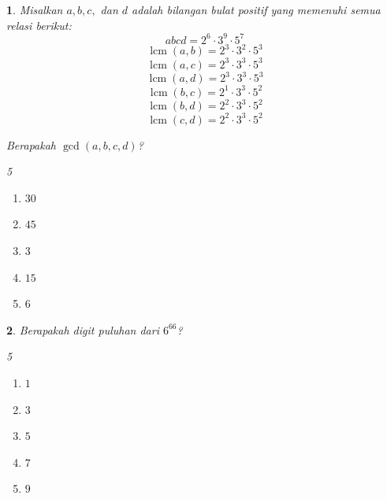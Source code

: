 \documentclass[11pt,a4paper,DIV=12]{scrartcl}
\theoremstyle{problemstyle}
\newtheorem{problem}{}
\theoremstyle{answerstyle}
\newenvironment{choices}[1][5]{%
  \begin{multicols}{#1}%
  \begin{enumerate}[label=(\Alph*)]%
}{%
  \end{enumerate}%
  \end{multicols}%
}
\begin{document}
\begin{problem}
  Misalkan \(a,b,c,\) dan \(d\) adalah bilangan bulat positif yang memenuhi semua relasi berikut:
  \[
    abcd=2^6\cdot 3^9\cdot 5^7
  \]
  \[
    \operatorname{lcm}(a,b)=2^3\cdot 3^2\cdot 5^3
  \]
  \[
    \operatorname{lcm}(a,c)=2^3\cdot 3^3\cdot 5^3
  \]
  \[
    \operatorname{lcm}(a,d)=2^3\cdot 3^3\cdot 5^3
  \]
  \[
    \operatorname{lcm}(b,c)=2^1\cdot 3^3\cdot 5^2
  \]
  \[
    \operatorname{lcm}(b,d)=2^2\cdot 3^3\cdot 5^2
  \]
  \[
    \operatorname{lcm}(c,d)=2^2\cdot 3^3\cdot 5^2
  \]

  Berapakah \(\gcd(a,b,c,d)\)?

  \begin{choices}
    \item $30$
    \item $45$
    \item $3$
    \item $15$
    \item $6$
  \end{choices}
\end{problem}
\begin{problem}
  Berapakah digit puluhan dari \(6^{66}\)?

  \begin{choices}
    \item $1$
    \item $3$
    \item $5$
    \item $7$
    \item $9$
  \end{choices}
\end{problem}
\end{document}
